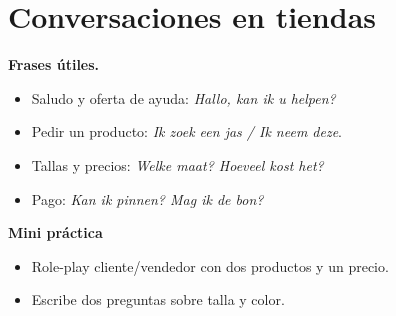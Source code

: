 \section{Conversaciones en tiendas}
\textbf{Frases útiles.}
\begin{itemize}[leftmargin=*]
  \item Saludo y oferta de ayuda: \textit{Hallo, kan ik u helpen?}
  \item Pedir un producto: \textit{Ik zoek een jas / Ik neem deze}.
  \item Tallas y precios: \textit{Welke maat? Hoeveel kost het?}
  \item Pago: \textit{Kan ik pinnen? Mag ik de bon?}
\end{itemize}

\textbf{Mini práctica}
\begin{itemize}[leftmargin=*]
  \item Role-play cliente/vendedor con dos productos y un precio.
  \item Escribe dos preguntas sobre talla y color.
\end{itemize}
